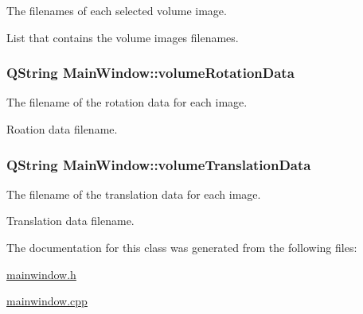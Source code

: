 The filenames of each selected volume image. 

List that contains the volume images filenames. \hypertarget{class_main_window_ad2139711b6f91f541304b5dc5cf311ac}{
\subsubsection[{volume\-Rotation\-Data}]{\setlength{\rightskip}{0pt plus 5cm}Q\-String {\bf Main\-Window\-::volume\-Rotation\-Data}}}\label{d9/dc6/class_main_window_ad2139711b6f91f541304b5dc5cf311ac}


The filename of the rotation data for each image. 

Roation data filename. \hypertarget{class_main_window_aec94bc06393ad4a2fc014d71fbeddbd3}{
\subsubsection[{volume\-Translation\-Data}]{\setlength{\rightskip}{0pt plus 5cm}Q\-String {\bf Main\-Window\-::volume\-Translation\-Data}}}\label{d9/dc6/class_main_window_aec94bc06393ad4a2fc014d71fbeddbd3}


The filename of the translation data for each image. 

Translation data filename. 

The documentation for this class was generated from the following files\-:\begin{DoxyCompactItemize}
\item 
\hyperlink{mainwindow_8h}{mainwindow.\-h}\item 
\hyperlink{mainwindow_8cpp}{mainwindow.\-cpp}\end{DoxyCompactItemize}
